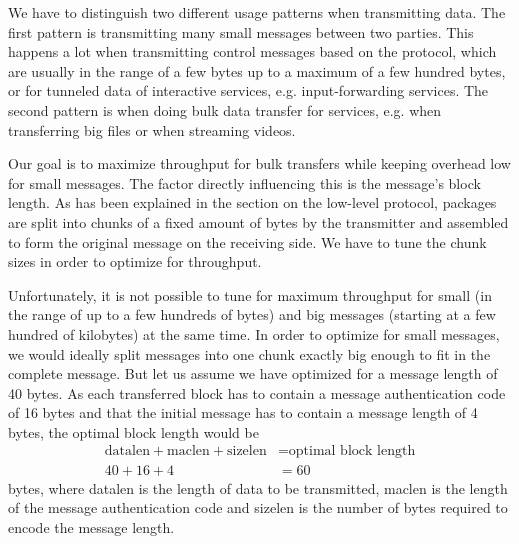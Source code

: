\medskip

We have to distinguish two different usage patterns when transmitting data.
The first pattern is transmitting many small messages between two parties.
This happens a lot when transmitting control messages based on the protocol, which are usually in the range of a few bytes up to a maximum of a few hundred bytes, or for tunneled data of interactive services, e.g. input-forwarding services.
The second pattern is when doing bulk data transfer for services, e.g. when transferring big files or when streaming videos.

Our goal is to maximize throughput for bulk transfers while keeping overhead low for small messages.
The factor directly influencing this is the message's block length.
As has been explained in the section on the low-level protocol, packages are split into chunks of a fixed amount of bytes by the transmitter and assembled to form the original message on the receiving side.
We have to tune the chunk sizes in order to optimize for throughput.

Unfortunately, it is not possible to tune for maximum throughput for small (in the range of up to a few hundreds of bytes) and big messages (starting at a few hundred of kilobytes) at the same time.
In order to optimize for small messages, we would ideally split messages into one chunk exactly big enough to fit in the complete message.
But let us assume we have optimized for a message length of 40 bytes.
As each transferred block has to contain a message authentication code of 16 bytes and that the initial message has to contain a message length of 4 bytes, the optimal block length would be
\begin{align*}
    \text{datalen} + \text{maclen} + \text{sizelen} &= \text{optimal block length}\\
    40 + 16 + 4 &= 60
\end{align*} bytes, where datalen is the length of data to be transmitted, maclen is the length of the message authentication code and sizelen is the number of bytes required to encode the message length.

